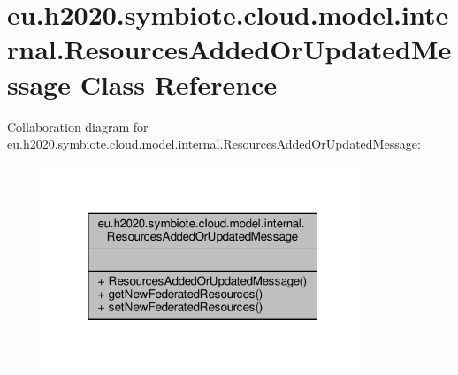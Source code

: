 \hypertarget{classeu_1_1h2020_1_1symbiote_1_1cloud_1_1model_1_1internal_1_1ResourcesAddedOrUpdatedMessage}{}\section{eu.\+h2020.\+symbiote.\+cloud.\+model.\+internal.\+Resources\+Added\+Or\+Updated\+Message Class Reference}
\label{classeu_1_1h2020_1_1symbiote_1_1cloud_1_1model_1_1internal_1_1ResourcesAddedOrUpdatedMessage}


Collaboration diagram for eu.\+h2020.\+symbiote.\+cloud.\+model.\+internal.\+Resources\+Added\+Or\+Updated\+Message\+:\nopagebreak
\begin{figure}[H]
\begin{center}
\leavevmode
\includegraphics[width=272pt]{classeu_1_1h2020_1_1symbiote_1_1cloud_1_1model_1_1internal_1_1ResourcesAddedOrUpdatedMessage__coll__graph}
\end{center}
\end{figure}
